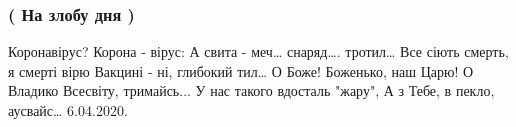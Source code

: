  
 
 

\subsubsection{( На злобу дня )}
\label{sec:poetry.rus.mykola_dudar_1950.korona_virus}

Коронавірус? Корона - вірус:
А свита - меч… снаряд…. тротил…
Все сіють смерть, я смерті вірю
Вакцині - ні, глибокий тил…
О Боже! Боженько, наш Царю! О
Владико Всесвіту, тримайсь...
У нас такого вдосталь "жару",
А з Тебе, в пекло, аусвайс…
6.04.2020. 
